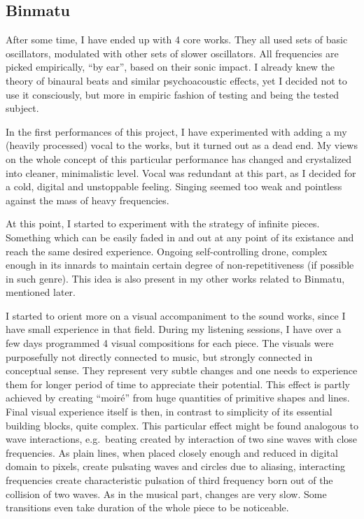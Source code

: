 \documentclass[12pt,a4paper,oneside]{report}
\begin{document}
\subsection{Binmatu} After some time, I have ended up with 4 core works. They all used sets of basic oscillators, modulated with other sets of slower oscillators. All frequencies are picked empirically, ``by ear'', based on their sonic impact. I already knew the theory of binaural beats and similar psychoacoustic effects, yet I decided not to use it consciously, but more in empiric fashion of testing and being the tested subject.

In the first performances of this project, I have experimented with adding a my (heavily processed) vocal to the works, but it turned out as a dead end. My views on the whole concept of this particular performance has changed and crystalized into cleaner, minimalistic level. Vocal was redundant at this part, as I decided for a cold, digital and unstoppable feeling. Singing seemed too weak and pointless against the mass of heavy frequencies. 

At this point, I started to experiment with the strategy of infinite pieces. Something which can be easily faded in and out at any point of its existance and reach the same desired experience. Ongoing self-controlling drone, complex enough in its innards to maintain certain degree of non-repetitiveness (if possible in such genre). This idea is also present in my other works related to Binmatu, mentioned later. 

I started to orient more on a visual accompaniment to the sound works, since I have small experience in that field. During my listening sessions, I have over a few days programmed 4 visual compositions for each piece. The visuals were purposefully not directly connected to music, but strongly connected in conceptual sense. They represent very subtle changes and one needs to experience them for longer period of time to appreciate their potential. This effect is partly achieved by creating ``moiré'' from huge quantities of primitive shapes and lines. Final visual experience itself is then, in contrast to simplicity of its essential building blocks, quite complex. This particular effect might be found analogous to wave interactions, e.g.\ beating created by interaction of two sine waves with close frequencies. As plain lines, when placed closely enough and reduced in digital domain to pixels, create pulsating waves and circles due to aliasing, interacting frequencies create characteristic pulsation of third frequency born out of the collision of two waves. As in the musical part, changes are very slow. Some transitions even take duration of the whole piece to be noticeable.
\end{document}

